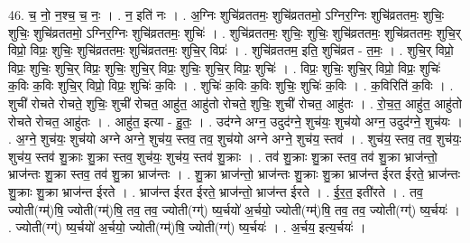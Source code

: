\documentclass[17pt]{extarticle}
\begin{document}
46. च॒ नो॒ न॒श्च॒ च॒ नः॒ । . न॒ इति॑ नः । . अ॒ग्निः शुचि॑व्रततमः॒ शुचि॑व्रततमो॒ ऽग्निर॒ग्निः शुचि॑व्रततमः॒ शुचिः॒ शुचिः॒ शुचि॑व्रततमो॒ ऽग्निर॒ग्निः शुचि॑व्रततमः॒ शुचिः॑ । . शुचि॑व्रततमः॒ शुचिः॒ शुचिः॒ शुचि॑व्रततमः॒ शुचि॑व्रततमः॒ शुचि॒र् विप्रो॒ विप्रः॒ शुचिः॒ शुचि॑व्रततमः॒ शुचि॑व्रततमः॒ शुचि॒र् विप्रः॑ । . शुचि॑व्रततम॒ इति॒ शुचि॑व्रत - त॒मः॒ । . शुचि॒र् विप्रो॒ विप्रः॒ शुचिः॒ शुचि॒र् विप्रः॒ शुचिः॒ शुचि॒र् विप्रः॒ शुचिः॒ शुचि॒र् विप्रः॒ शुचिः॑ । . विप्रः॒ शुचिः॒ शुचि॒र् विप्रो॒ विप्रः॒ शुचिः॑ क॒विः क॒विः शुचि॒र् विप्रो॒ विप्रः॒ शुचिः॑ क॒विः । . शुचिः॑ क॒विः क॒विः शुचिः॒ शुचिः॑ क॒विः । . क॒विरिति॑ क॒विः । . शुची॑ रोचते रोचते॒ शुचिः॒ शुची॑ रोचत॒ आहु॑त॒ आहु॑तो रोचते॒ शुचिः॒ शुची॑ रोचत॒ आहु॑तः । . रो॒च॒त॒ आहु॑त॒ आहु॑तो रोचते रोचत॒ आहु॑तः । . आहु॑त॒ इत्या - हु॒तः॒ । . उद॑ग्ने अग्न॒ उदुद॑ग्ने॒ शुच॑यः॒ शुच॑यो अग्न॒ उदुद॑ग्ने॒ शुच॑यः । . अ॒ग्ने॒ शुच॑यः॒ शुच॑यो अग्ने अग्ने॒ शुच॑य॒ स्तव॒ तव॒ शुच॑यो अग्ने अग्ने॒ शुच॑य॒ स्तव॑ । . शुच॑य॒ स्तव॒ तव॒ शुच॑यः॒ शुच॑य॒ स्तव॑ शु॒क्राः शु॒क्रा स्तव॒ शुच॑यः॒ शुच॑य॒ स्तव॑ शु॒क्राः । . तव॑ शु॒क्राः शु॒क्रा स्तव॒ तव॑ शु॒क्रा भ्राज॑न्तो॒ भ्राज॑न्तः शु॒क्रा स्तव॒ तव॑ शु॒क्रा भ्राज॑न्तः । . शु॒क्रा भ्राज॑न्तो॒ भ्राज॑न्तः शु॒क्राः शु॒क्रा भ्राज॑न्त ईरत ईरते॒ भ्राज॑न्तः शु॒क्राः शु॒क्रा भ्राज॑न्त ईरते । . भ्राज॑न्त ईरत ईरते॒ भ्राज॑न्तो॒ भ्राज॑न्त ईरते । . ई॒र॒त॒ इती॑रते । . तव॒ ज्योती(ग्म्॑)षि॒ ज्योती(ग्म्॑)षि॒ तव॒ तव॒ ज्योती(ग्ग्॑) ष्य॒र्चयो॑ अ॒र्चयो॒ ज्योती(ग्म्॑)षि॒ तव॒ तव॒ ज्योती(ग्ग्॑) ष्य॒र्चयः॑ । . ज्योती(ग्ग्॑) ष्य॒र्चयो॑ अ॒र्चयो॒ ज्योती(ग्म्॑)षि॒ ज्योती(ग्ग्॑) ष्य॒र्चयः॑ । . अ॒र्चय॒ इत्य॒र्चयः॑ । \newline
\pagebreak
\end{document}
